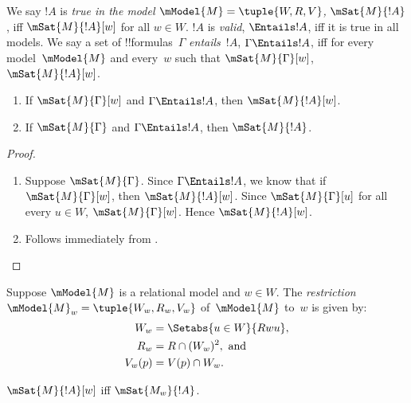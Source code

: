\documentclass[../../../include/open-logic-section]{subfiles}
\begin{document}


\begin{defn}
  We say $!A$ is \emph{true in the model $\mModel{M} = \tuple{W,R,V}$,} $
  \mSat{M}{!A}$, iff $\mSat{M}{!A}[w]$ for all $w \in W$.
  $!A$ is \emph{valid}, $\Entails !A$, iff it is true in all models.
  We say a set of !!{formula}s~$\Gamma$ \emph{entails}~$!A$, $\Gamma
  \Entails !A$, iff for every model~$\mModel{M}$ and every~$w$ such
  that $\mSat{M}{\Gamma}[w]$, $\mSat{M}{!A}[w]$.
\end{defn}

\begin{prop}
  \begin{enumerate}
  \item{} If $\mSat{M}{\Gamma}[w]$ and
    $\Gamma \Entails !A$, then $\mSat{M}{!A}[w]$.
  \item{} If $\mSat{M}{\Gamma}$ and $\Gamma
    \Entails !A$, then $\mSat{M}{!A}$.
  \end{enumerate}
\end{prop}

\begin{proof}
  \begin{enumerate}
  \item Suppose $\mSat{M}{\Gamma}$. Since $\Gamma \Entails !A$, we
    know that if $\mSat{M}{\Gamma}[w]$, then $\mSat{M}{!A}[w]$. Since
    $\mSat{M}{\Gamma}[u]$ for all every $u \in W$,
    $\mSat{M}{\Gamma}[w]$. Hence $\mSat{M}{!A}[w]$.
  \item Follows immediately from .
  \end{enumerate}
\end{proof}


\begin{defn}
  Suppose $\mModel{M}$ is a relational model and $w \in W$. The
  \emph{restriction} $\mModel{M}_w=\tuple{W_w, R_w, V_w}$
  of~$\mModel{M}$ to~$w$ is given by:
  \begin{align*}
    W_w & = \Setabs{u \in W}{Rwu},\\
    R_w  & = R \cap (W_w)^2, \text{ and}\\
    V_w(p) & = V(p) \cap W_w.
  \end{align*}
\end{defn}

\begin{prop}
  $\mSat{M}{!A}[w]$ iff $\mSat{M_w}{!A}$.
\end{prop}
\end{document}
